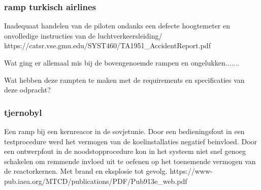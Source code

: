 \subsubsection{ramp turkisch airlines}
Inadequaat handelen van de piloten ondanks een defecte hoogtemeter en onvolledige instructies van de luchtverkeersleiding/
https://catsr.vse.gmu.edu/SYST460/TA1951_AccidentReport.pdf 

Wat ging er allemaal mis bij de bovengenoemde rampen en ongelukken....... 

Wat hebben deze rampten te maken met de requirements en specificaties van deze odpracht? 



\subsubsection{tjernobyl}
Een ramp bij een kernreacor in de sovjetunie. Door een bedieningsfout in een testprocedure werd het vermogen van de koelinstallaties negatief beinvloed. Door een ontwerpfout in de noodstopprocedure kon in het systeem niet snel genoeg schakelen om remmende invloed uit te oefenen op het toenemende vermogen van de reactorkernen. Met brand en eksplosie tot gevolg.
https://www-pub.iaea.org/MTCD/publications/PDF/Pub913e_web.pdf 



